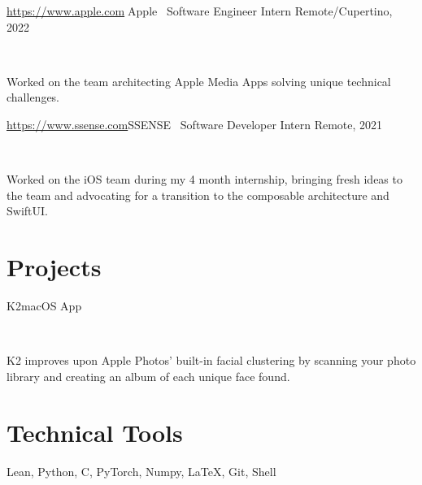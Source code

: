 \documentclass[]{style}
\begin{document}
\begin{entrylist}

\vspace{1mm}

\entry
{\url{https://www.apple.com}{Apple} \ {\normalfont Software Engineer Intern}}
{Remote/Cupertino, 2022}
{ ~ \vspace{-2.5mm}

Worked on the team architecting Apple Media Apps solving unique technical challenges. }

\vspace{1mm}

\entry
{\url{https://www.ssense.com}{SSENSE} \ {\normalfont Software Developer Intern}}
{Remote, 2021}
{ ~ \vspace{-2.5mm}

Worked on the iOS team during my 4 month internship, bringing fresh ideas to the team and advocating for a transition to the composable architecture and SwiftUI.}

\end{entrylist}

\section{Projects}

\begin{entrylist}

\vspace{1mm}

\entry
{K2}{macOS App}
{ ~ \vspace{-2.5mm}

K2 improves upon Apple Photos' built-in facial clustering by scanning your photo library and creating an album of each unique face found.}

\end{entrylist}

\section{Technical Tools}

Lean, Python, C, PyTorch, Numpy, \LaTeX, Git, Shell
\end{document}
